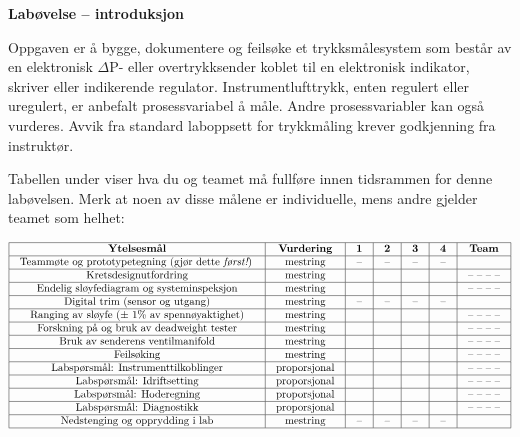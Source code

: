 

\noindent
{\bf Labøvelse -- introduksjon}

\vskip 5pt

Oppgaven er å bygge, dokumentere og feilsøke et trykksmålesystem som består av en elektronisk $\Delta$P- eller overtrykksender koblet til en elektronisk indikator, skriver eller indikerende regulator. Instrumentlufttrykk, enten regulert eller uregulert, er anbefalt prosessvariabel å måle. Andre prosessvariabler kan også vurderes. Avvik fra standard laboppsett for trykkmåling krever godkjenning fra instruktør.

Tabellen under viser hva du og teamet må fullføre innen tidsrammen for denne labøvelsen.  Merk at noen av disse målene er individuelle, mens andre gjelder teamet som helhet:



$$\vbox{\offinterlineskip
\halign{\strut
\vrule \quad\hfil # \ \hfil & 
\vrule \quad\hfil # \ \hfil & 
\vrule \quad\hfil # \ \hfil & 
\vrule \quad\hfil # \ \hfil & 
\vrule \quad\hfil # \ \hfil & 
\vrule \quad\hfil # \ \hfil & 
\vrule \quad\hfil # \ \hfil \vrule \cr
\noalign{\hrule}
%
{\bf Ytelsesmål} & {\bf Vurdering} & {\bf 1} & {\bf 2} & {\bf 3} & {\bf 4} & {\bf Team} \cr
%
\noalign{\hrule}
%
Teammøte og prototypetegning (gjør dette {\it først!}) & mestring & -- & -- & -- & -- & \cr
%
\noalign{\hrule}
%
Kretsdesignutfordring & mestring & & & & & -- -- -- -- \cr
%
\noalign{\hrule}
%
Endelig sløyfediagram og systeminspeksjon & mestring & & & & & -- -- -- -- \cr
%
\noalign{\hrule}
%
Digital trim (sensor og utgang) & mestring & -- & -- & -- & -- &  \cr
%
\noalign{\hrule}
%
Ranging av sløyfe ($\pm$ 1\% av spennøyaktighet) & mestring & & & & & -- -- -- -- \cr
%
\noalign{\hrule}
%
Forskning på og bruk av deadweight tester & mestring & & & & & -- -- -- -- \cr
%
\noalign{\hrule}
%
Bruk av senderens ventilmanifold & mestring & & & & & -- -- -- -- \cr
%
\noalign{\hrule}
%
Feilsøking & mestring & & & & & -- -- -- -- \cr
%
\noalign{\hrule}
%
Labspørsmål: Instrumenttilkoblinger & proporsjonal &  &  &  &  & -- -- -- -- \cr
%
\noalign{\hrule}
%
Labspørsmål: Idriftsetting & proporsjonal &  &  &  &  & -- -- -- -- \cr
%
\noalign{\hrule}
%
Labspørsmål: Hoderegning & proporsjonal &  &  &  &  & -- -- -- -- \cr
%
\noalign{\hrule}
%
Labspørsmål: Diagnostikk & proporsjonal &  &  &  &  & -- -- -- -- \cr
%
\noalign{\hrule}
%
Nedstenging og opprydding i lab & mestring & -- & -- & -- & -- &  \cr
%
\noalign{\hrule}
} %
}$$ %

